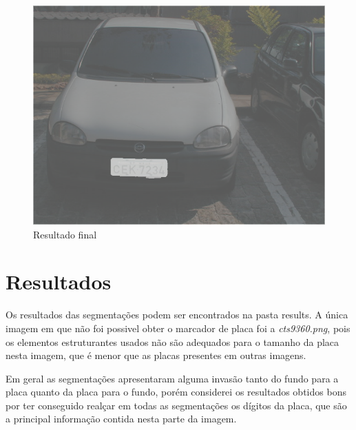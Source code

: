 \documentclass[11pt]{article} %
\begin{document}
\begin{figure}[!h]
	\begin{center}
	\includegraphics[scale=0.5]{img_relatorio/step8-final.png}
	\caption{Resultado final}\label{final}
	\end{center}
\end{figure}

\section{Resultados}

Os resultados das segmentações podem ser encontrados na pasta results. A única imagem em que não foi possivel obter o marcador de placa foi a {\em cts9360.png}, pois os elementos estruturantes usados não são adequados para o tamanho da placa nesta imagem, que é menor que as placas presentes em outras imagens.

Em geral as segmentações apresentaram alguma invasão tanto do fundo para a placa quanto da placa para o fundo, porém considerei os resultados obtidos bons por ter conseguido realçar em todas as segmentações os dígitos da placa, que são a principal informação contida nesta parte da imagem.
\end{document}
